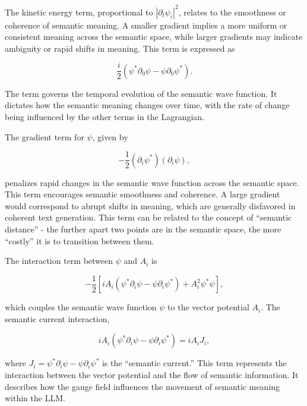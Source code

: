 \documentclass[prd,amsmath,amssymb,12pt]{revtex4}
\begin{document}
The kinetic energy term, proportional to $|\partial_t\psi_i|^2$, relates to the smoothness or coherence of semantic
meaning.
A smaller gradient implies a more uniform or consistent meaning across the semantic space, while larger gradients
may indicate ambiguity or rapid shifts in meaning. This term is expressed as

\begin{equation}
    \frac{i}{2}\left(\psi^* \partial_0 \psi - \psi \partial_0 \psi^*\right).
\end{equation}

\noindent
The term governs the temporal evolution of the semantic wave function. It dictates how the semantic
meaning changes over time, with the rate of change being influenced by the other terms in the Lagrangian.

The gradient term for $\psi$, given by

\begin{equation}
    -\frac{1}{2}(\partial_i \psi^*) (\partial_i \psi),
\end{equation}

\noindent
penalizes rapid changes in the semantic wave function across the semantic space. This term encourages semantic
smoothness and coherence. A large gradient would correspond to abrupt shifts in meaning, which are generally
disfavored in coherent text generation. This term can be related to the concept of ``semantic distance'' -
the further apart two points are in the semantic space, the more ``costly'' it is to transition between them.

The interaction term between $\psi$ and $A_i$ is

\begin{equation}
    -\frac{1}{2} \left[ i A_i (\psi^* \partial_i \psi - \psi \partial_i \psi^*) + A_i^2 \psi^* \psi \right],
\end{equation}

\noindent
which couples the semantic wave function $\psi$ to the vector potential $A_i$.
The semantic current interaction,

\begin{equation}
    i A_i (\psi^* \partial_i \psi - \psi \partial_i \psi^*) = i A_i J_i,
\end{equation}

\noindent
where $J_i = \psi^* \partial_i \psi - \psi \partial_i \psi^*$ is the ``semantic current.'' This term represents the
interaction between the vector potential and the flow of semantic information. It describes how the gauge field
influences the movement of semantic meaning within the LLM.
\end{document}
